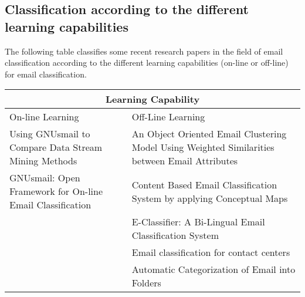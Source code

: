\subsection{Classification according to the different learning capabilities}
The following table classifies some recent research papers in the field of email classification according to the different learning capabilities (on-line or off-line) for email classification.

\begin{center}
\begin{tabular}{|p{6cm}|p{6cm}|}
\hline
\multicolumn{2}{|c|}{Learning Capability} \\
\hline
On-line Learning & Off-Line Learning 
\\ \hline
Using GNUsmail to Compare Data Stream Mining Methods \cite{JOSE11} &
An Object Oriented Email Clustering Model Using  Weighted Similarities 
between Email Attributes \cite{NARESH10}
\\ \hline

GNUsmail: Open Framework for On-line Email Classification \cite{MANUEL11}
& Content Based Email Classification System by applying Conceptual Maps \cite{BASKARAN09}
\\ \hline

& E-Classifier: A Bi-Lingual Email Classification System \cite{NOUF08}
\\ \hline

& Email classification for contact centers \cite{ANI03}
\\ \hline

& 
Automatic Categorization of Email into Folders \cite{RON04}

\\ \hline

\end{tabular}
\end{center}



